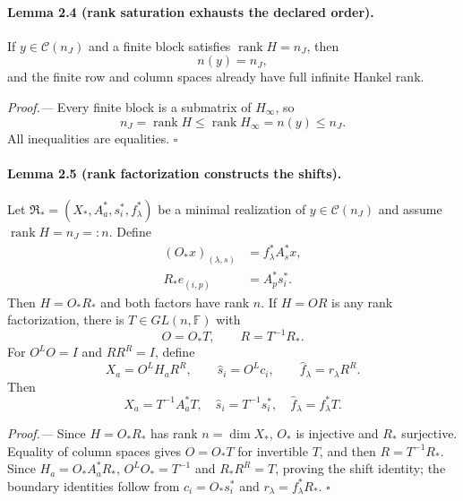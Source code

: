 \documentclass[aps,prl,onecolumn,superscriptaddress,nofootinbib]{revtex4-2}
\newcommand{\F}{\mathbb F}
\newcommand{\rank}{\operatorname{rank}}
\newcommand{\cC}{\mathcal C}
\begin{document}
\paragraph{Lemma 2.4 (rank saturation exhausts the declared order).}
If $y\in\cC(n_J)$ and a finite block satisfies $\rank H=n_J$, then
\begin{equation}
 n(y)=n_J,
 \label{eq:rank-saturates}
\end{equation}
and the finite row and column spaces already have full infinite Hankel rank.

\emph{Proof.---}
Every finite block is a submatrix of $H_\infty$, so
\begin{equation}
 n_J=\rank H\le\rank H_\infty=n(y)\le n_J.
\end{equation}
All inequalities are equalities. \hfill$\square$

\paragraph{Lemma 2.5 (rank factorization constructs the shifts).}
Let $\mathfrak R_*=(X_*,A_a^*,s_i^*,f_\lambda^*)$ be a minimal realization of $y\in\cC(n_J)$ and assume $\rank H=n_J=:n$.  Define
\begin{align}
 (O_*x)_{(\lambda,s)}&=f_\lambda^*A_s^*x,\nonumber\\
 R_*e_{(i,p)}&=A_p^*s_i^*.
 \label{eq:finite-OR}
\end{align}
Then $H=O_*R_*$ and both factors have rank $n$.  If $H=OR$ is any rank factorization, there is $T\in GL(n,\F)$ with
\begin{equation}
 O=O_*T,
 \qquad R=T^{-1}R_*.
 \label{eq:factor-gauge}
\end{equation}
For $O^LO=I$ and $RR^R=I$, define
\begin{equation}
 X_a=O^LH_aR^R,
 \qquad \widehat s_i=O^Lc_i,
 \qquad \widehat f_\lambda=r_\lambda R^R.
 \label{eq:recon-SM}
\end{equation}
Then
\begin{equation}
 X_a=T^{-1}A_a^*T,
 \quad \widehat s_i=T^{-1}s_i^*,
 \quad \widehat f_\lambda=f_\lambda^*T.
 \label{eq:similarity-result}
\end{equation}

\emph{Proof.---}
Since $H=O_*R_*$ has rank $n=\dim X_*$, $O_*$ is injective and $R_*$ surjective.  Equality of column spaces gives $O=O_*T$ for invertible $T$, and then $R=T^{-1}R_*$.  Since $H_a=O_*A_a^*R_*$,
$O^LO_*=T^{-1}$ and $R_*R^R=T$, proving the shift identity; the boundary identities follow from $c_i=O_*s_i^*$ and $r_\lambda=f_\lambda^*R_*$. \hfill$\square$
\end{document}
